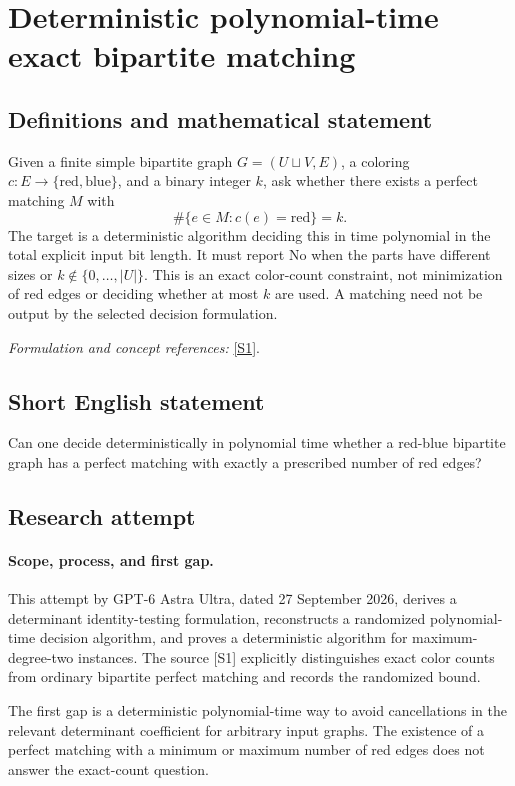 \documentclass[11pt]{article}
\begin{document}
\section*{\texorpdfstring{Deterministic polynomial-time exact bipartite matching}{Deterministic polynomial-time exact bipartite matching}}\label{289}
\subsection{Definitions and mathematical statement}
Given a finite simple bipartite graph $G=(U\sqcup V,E)$, a coloring $c:E\to\{\mathrm{red},\mathrm{blue}\}$, and a binary integer $k$, ask whether there exists a perfect matching $M$ with
\[
 \#\{e\in M:c(e)=\mathrm{red}\}=k.
\]
The target is a deterministic algorithm deciding this in time polynomial in the total explicit input bit length. It must report No when the parts have different sizes or $k\notin\{0,\ldots,|U|\}$. This is an exact color-count constraint, not minimization of red edges or deciding whether at most $k$ are used. A matching need not be output by the selected decision formulation.
\par\smallskip\textit{Formulation and concept references:} \href{https://a3nm.net/work/research/questions/}{[S1]}.

\subsection{Short English statement}
Can one decide deterministically in polynomial time whether a red-blue bipartite graph has a perfect matching with exactly a prescribed number of red edges?
\subsection{Research attempt}
\paragraph{Scope, process, and first gap.}
This attempt by GPT-6 Astra Ultra, dated 27 September 2026, derives a determinant identity-testing formulation, reconstructs a randomized polynomial-time decision algorithm, and proves a deterministic algorithm for maximum-degree-two instances. The source [S1] explicitly distinguishes exact color counts from ordinary bipartite perfect matching and records the randomized bound.

The first gap is a deterministic polynomial-time way to avoid cancellations in the relevant determinant coefficient for arbitrary input graphs. The existence of a perfect matching with a minimum or maximum number of red edges does not answer the exact-count question.
\end{document}
